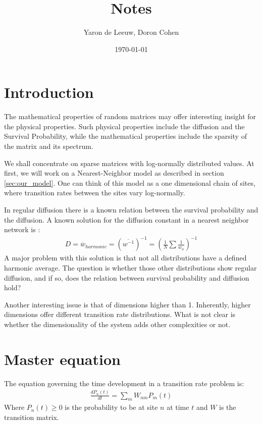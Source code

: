 \documentclass[onecolumn,fleqn]{revtex4}
\begin{document}
\title{Notes}

\author{Yaron de Leeuw, Doron Cohen}
\date{\today}
\maketitle



\section{Introduction}
The mathematical properties of random matrices may offer interesting insight for the physical properties. Such physical properties include the diffusion and the Survival Probability, while the mathematical properties include the sparsity of the matrix and its spectrum. 

We shall concentrate on sparse matrices with log-normally distributed values. At first, we will work on a Nearest-Neighbor model as described in section \ref{sec:our_model}. One can think of this model as a one dimensional chain of sites, where transition rates between the sites vary log-normally.

In regular diffusion there is a known relation between the survival probability and the diffusion. 
A known solution for the diffusion constant in a nearest neighbor network is \cite{Derrida:1983}:
\begin{align}
D=\overline{w}_{harmonic} =(\overline{w^{-1}})^{-1}=\left(\frac{1}{N}\sum\frac{1}{w_n}\right)^{-1}
\end{align}
A major problem with this solution is that not all distributions have a defined harmonic average. The question is whether those other distributions show regular diffusion, and if so, does the relation between survival probability and diffusion hold?


Another interesting issue is that of dimensions higher than 1. Inherently, higher dimensions offer different transition rate distributions. What is not clear is whether the dimensionality of the system adds other complexities or not. 



\section{Master equation}
The equation governing the time development in a transition rate problem is:
\begin{align}
\frac{dP_n(t)}{dt} = \sum_m W_{nm}P_m(t)
\end{align}
Where $P_n(t) \ge 0$ is the probability to be at site $n$ at time $t$ and $W$ is the transition matrix.
\end{document}
